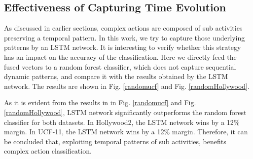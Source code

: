 \subsection{Effectiveness of Capturing Time Evolution}
As discussed in earlier sections, complex actions are composed of sub activities preserving
a temporal pattern. In this work, we try to capture those underlying patterns by an LSTM network.
It is interesting to verify whether this strategy has an impact on the accuracy of the
classification. Here we directly feed the fused vectors to a random forest classifier, which
does not capture sequential dynamic patterns, and compare it with the results obtained by
the LSTM network. The results are shown in Fig. \ref{randomucf} and Fig. \ref{randomHollywood}.


As it is evident from the results in in Fig. \ref{randomucf} and Fig. \ref{randomHollywood}, LSTM network significantly outperforms the
random forest classifier for both datasets. In Hollywood2, the LSTM network wins by a 12\% margin. In UCF-11, the LSTM network wins by a 12\% margin.
Therefore, it can be concluded that, exploiting
temporal patterns of sub activities, benefits complex action classification.



\mydata

